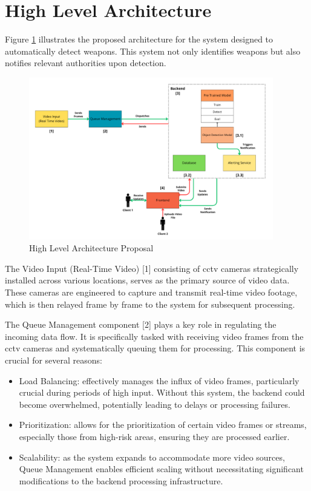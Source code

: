 \section{High Level Architecture}
Figure \ref{fig:architecture-proposal} illustrates the proposed architecture for the system designed to automatically detect weapons. This system not only identifies weapons but also notifies relevant authorities upon detection. 

\begin{figure}[ht]
    \centering 
    \includegraphics[width=0.95\textwidth]{figs/architecture2.png} 
    \caption{High Level Architecture Proposal}
    \label{fig:architecture-proposal}
\end{figure}

The Video Input (Real-Time Video) [1] consisting of \ac{cctv} cameras strategically installed across various locations, serves as the primary source of video data. These cameras are engineered to capture and transmit real-time video footage, which is then relayed frame by frame to the system for subsequent processing.

The Queue Management component [2] plays a key role in regulating the incoming data flow. It is specifically tasked with receiving video frames from the \ac{cctv} cameras and systematically queuing them for processing. This component is crucial for several reasons:
\begin{itemize}
    \item Load Balancing: effectively manages the influx of video frames, particularly crucial during periods of high input. Without this system, the backend could become overwhelmed, potentially leading to delays or processing failures.
    \item Prioritization: allows for the prioritization of certain video frames or streams, especially those from high-risk areas, ensuring they are processed earlier.
    \item Scalability: as the system expands to accommodate more video sources, Queue Management enables efficient scaling without necessitating significant modifications to the backend processing infrastructure.
\end{itemize}

